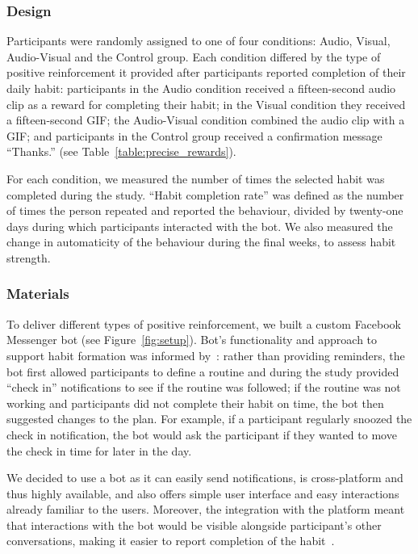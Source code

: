\documentclass{scaffold/sigchi}
\begin{document}
\subsubsection{Design}
Participants were randomly assigned to one of four conditions: Audio, Visual, Audio-Visual and the Control group. Each condition differed by the type of positive reinforcement it provided after participants reported completion of their daily habit: participants in the Audio condition received a fifteen-second audio clip as a reward for completing their habit; in the Visual condition they received a fifteen-second GIF; the Audio-Visual condition combined the audio clip with a GIF; and participants in the Control group received a confirmation message ``Thanks.'' (see Table~\ref{table:precise_rewards}). 

For each condition, we measured the number of times the selected habit was completed during the study. ``Habit completion rate'' was defined as the number of times the person repeated and reported the behaviour, divided by twenty-one days during which participants interacted with the bot. We also measured the change in automaticity of the behaviour during the final weeks, to assess habit strength.



\subsubsection{Materials}
To deliver different types of positive reinforcement, we built a custom Facebook Messenger bot (see Figure~\ref{fig:setup}). Bot's functionality and approach to support habit formation was informed by~\cite{article_beyond_self_tracking_designing_apps}: rather than providing reminders, the bot first allowed participants to define a routine and during the study provided ``check in'' notifications to see if the routine was followed; if the routine was not working and participants did not complete their habit on time, the bot then suggested changes to the plan. For example, if a participant regularly snoozed the check in notification, the bot would ask the participant if they wanted to move the check in time for later in the day.

We decided to use a bot as it can easily send notifications, is cross-platform and thus highly available, and also offers simple user interface and easy interactions already familiar to the users. Moreover, the integration with the platform meant that interactions with the bot would be visible alongside participant's other conversations, making it easier to report completion of the habit~\cite{the_power_of_logging_mobile_notifications}.
\end{document}
